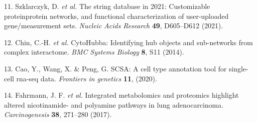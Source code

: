 \documentclass[
]{article}
\newenvironment{cslreferences}%
  {}%
  {\par}
\begin{document}
\begin{cslreferences}
\leavevmode\hypertarget{ref-TheStringDataSzklar2021}{}%
11. Szklarczyk, D. \emph{et al.} The string database in 2021: Customizable proteinprotein networks, and functional characterization of user-uploaded gene/measurement sets. \emph{Nucleic Acids Research} \textbf{49}, D605--D612 (2021).

\leavevmode\hypertarget{ref-CytohubbaIdenChin2014}{}%
12. Chin, C.-H. \emph{et al.} CytoHubba: Identifying hub objects and sub-networks from complex interactome. \emph{BMC Systems Biology} \textbf{8}, S11 (2014).

\leavevmode\hypertarget{ref-ScsaACellTyCaoY2020}{}%
13. Cao, Y., Wang, X. \& Peng, G. SCSA: A cell type annotation tool for single-cell rna-seq data. \emph{Frontiers in genetics} \textbf{11}, (2020).

\leavevmode\hypertarget{ref-IntegratedMetaFahrma2017}{}%
14. Fahrmann, J. F. \emph{et al.} Integrated metabolomics and proteomics highlight altered nicotinamide- and polyamine pathways in lung adenocarcinoma. \emph{Carcinogenesis} \textbf{38}, 271--280 (2017).
\end{cslreferences}
\end{document}
